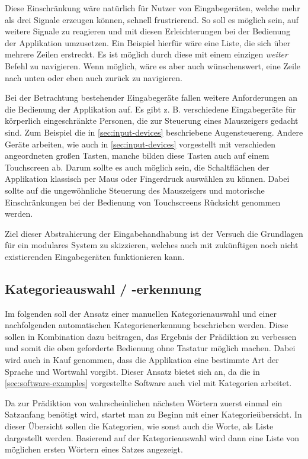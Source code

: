        Diese Einschränkung wäre natürlich für Nutzer von Eingabegeräten, welche mehr als drei Signale erzeugen können, schnell frustrierend. So soll es möglich sein, auf weitere Signale zu reagieren und mit diesen Erleichterungen bei der Bedienung der Applikation umzusetzen. Ein Beispiel hierfür wäre eine Liste, die sich über mehrere Zeilen erstreckt. Es ist möglich durch diese mit einem einzigen \emph{weiter} Befehl zu navigieren. Wenn möglich, wäre es aber auch wünschenswert, eine Zeile nach unten oder eben auch zurück zu navigieren.
        
        Bei der Betrachtung bestehender Eingabegeräte fallen weitere Anforderungen an die Bedienung der Applikation auf. Es gibt z. B. verschiedene Eingabegeräte für körperlich eingeschränkte Personen, die zur Steuerung eines Mauszeigers gedacht sind. Zum Beispiel die in \autoref{sec:input-devices} beschriebene Augensteuereng. Andere Geräte arbeiten, wie auch in \autoref{sec:input-devices} vorgestellt mit verschieden angeordneten großen Tasten, manche bilden diese Tasten auch auf einem Touchscreen ab. Darum sollte es auch möglich sein, die Schaltflächen der Applikation klassisch per Maus oder Fingerdruck auswählen zu können. Dabei sollte auf die ungewöhnliche Steuerung des Mauszeigers und motorische Einschränkungen bei der Bedienung von Touchscreens Rücksicht genommen werden.
        
        Ziel dieser Abstrahierung der Eingabehandhabung ist der Versuch die Grundlagen für ein modulares System zu skizzieren, welches auch mit zukünftigen noch nicht existierenden Eingabegeräten funktionieren kann.
        
    \newpage   
	\subsection{Kategorieauswahl / -erkennung}
    \label{sec:requirements_categories}
    
    	Im folgenden soll der Ansatz einer manuellen Kategorienauswahl und einer nachfolgenden automatischen Kategorienerkennung beschrieben werden. Diese sollen in Kombination dazu beitragen, das Ergebnis der Prädiktion zu verbessen und somit die oben geforderte Bedienung ohne Tastatur möglich machen. Dabei wird auch in Kauf genommen, dass die Applikation eine bestimmte Art der Sprache und Wortwahl vorgibt. Dieser Ansatz bietet sich an, da die in \autoref{sec:software-examples} vorgestellte Software auch viel mit Kategorien arbeitet.
        
    	Da zur Prädiktion von wahrscheinlichen nächsten Wörtern zuerst einmal ein Satzanfang benötigt wird, startet man zu Beginn mit einer Kategorieübersicht. In dieser Übersicht sollen die Kategorien, wie sonst auch die Worte, als Liste dargestellt werden. Basierend auf der Kategorieauswahl wird dann eine Liste von möglichen ersten Wörtern eines Satzes angezeigt. 
        
